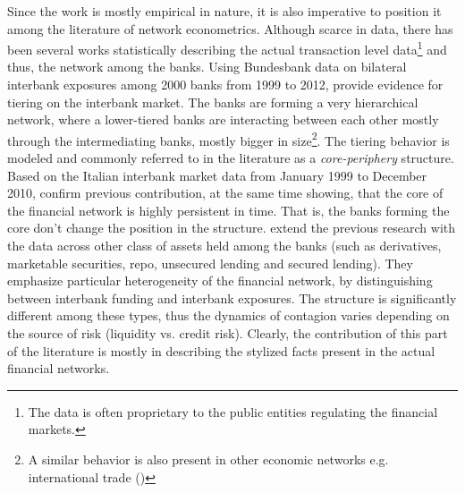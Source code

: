 \documentclass[12pt]{article}
\begin{document}
Since the work is mostly empirical in nature, it is also imperative to position it among the literature of network econometrics. Although scarce in data, there has been several works statistically describing the actual transaction level data\footnote{The data is often proprietary to the public entities regulating the financial markets.} and thus, the network among the banks.  Using Bundesbank data on bilateral interbank exposures among 2000 banks from 1999 to 2012, \cite{craig14} provide evidence for tiering on the interbank market. The banks are forming a very hierarchical network, where a lower-tiered banks are interacting between each other mostly through the intermediating banks, mostly bigger in size\footnote{A similar behavior is also present in other economic networks e.g. international trade (\cite{antras11})}. The tiering behavior is modeled and commonly referred to in the literature as a \textit{core-periphery} structure. Based on the Italian interbank market data from January 1999 to December 2010, \cite{fricke2015} confirm previous contribution, at the same time showing, that the core of the financial network is highly persistent in time. That is, the banks forming the core don't change the position in the structure. \cite{langfield14} extend the previous research with the data across other class of assets held among the banks (such as derivatives, marketable securities, repo, unsecured lending and secured lending). They emphasize particular heterogeneity of the financial network, by distinguishing between interbank funding and interbank exposures. The structure is significantly different among these types, thus the dynamics of contagion varies depending on the source of risk (liquidity vs. credit risk). Clearly, the contribution of this part of the literature is mostly in describing the stylized facts present in the actual financial networks.
\end{document}
